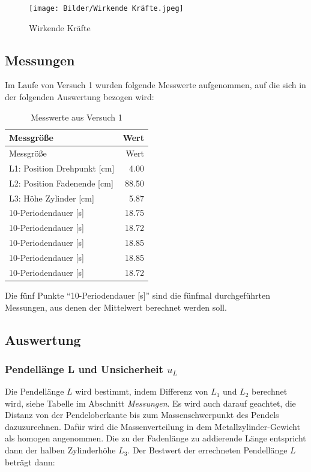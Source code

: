\documentclass[
  9pt,
]{article}
\begin{document}
\begin{figure}
\centering
\texttt{[image: Bilder/Wirkende Kräfte.jpeg]}
\caption{Wirkende Kräfte}
\end{figure}

\hypertarget{messungen}{%
\subsection{Messungen}\label{messungen}}

Im Laufe von Versuch 1 wurden folgende Messwerte aufgenommen, auf die
sich in der folgenden Auswertung bezogen wird:

\begin{longtable}[]{@{}lr@{}}
\caption{Messwerte aus Versuch 1}\tabularnewline
\toprule
Messgröße & Wert \\
\midrule
\endfirsthead
\toprule
Messgröße & Wert \\
\midrule
\endhead
L1: Position Drehpunkt {[}cm{]} & 4.00 \\
L2: Position Fadenende {[}cm{]} & 88.50 \\
L3: Höhe Zylinder {[}cm{]} & 5.87 \\
10-Periodendauer {[}s{]} & 18.75 \\
10-Periodendauer {[}s{]} & 18.72 \\
10-Periodendauer {[}s{]} & 18.85 \\
10-Periodendauer {[}s{]} & 18.85 \\
10-Periodendauer {[}s{]} & 18.72 \\
\bottomrule
\end{longtable}

Die fünf Punkte ``10-Periodendauer {[}s{]}'' sind die fünfmal
durchgeführten Messungen, aus denen der Mittelwert berechnet werden
soll.

\hypertarget{auswertung}{%
\subsection{Auswertung}\label{auswertung}}

\hypertarget{pendelluxe4nge-l-und-unsicherheit-u_l}{%
\subsubsection{\texorpdfstring{Pendellänge L und Unsicherheit
\(u_L\)}{Pendellänge L und Unsicherheit u\_L}}\label{pendelluxe4nge-l-und-unsicherheit-u_l}}

Die Pendellänge \(L\) wird bestimmt, indem Differenz von \(L_1\) und
\(L_2\) berechnet wird, siehe Tabelle im Abschnitt \textit{Messungen}.
Es wird auch darauf geachtet, die Distanz von der Pendeloberkante bis
zum Massenschwerpunkt des Pendels dazuzurechnen. Dafür wird die
Massenverteilung in dem Metallzylinder-Gewicht als homogen angenommen.
Die zu der Fadenlänge zu addierende Länge entspricht dann der halben
Zylinderhöhe \(L_3\). Der Bestwert der errechneten Pendellänge \(L\)
beträgt dann:
\end{document}
